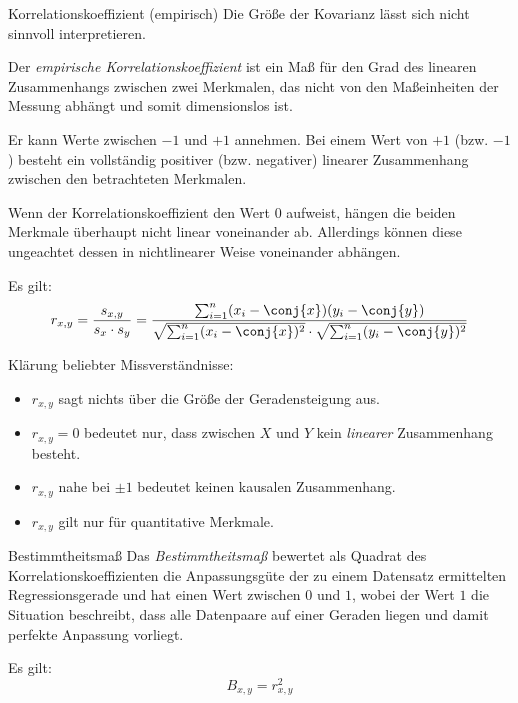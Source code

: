 \begin{defi}{Korrelationskoeffizient (empirisch)}
    Die Größe der Kovarianz lässt sich nicht sinnvoll interpretieren.

    Der \emph{empirische Korrelationskoeffizient} ist ein Maß für den Grad des linearen Zusammenhangs zwischen zwei Merkmalen, das nicht von den Maßeinheiten der Messung abhängt und somit dimensionslos ist.

    Er kann Werte zwischen $-1$ und $+1$ annehmen.
    Bei einem Wert von $+1$ (bzw. $-1$) besteht ein vollständig positiver (bzw. negativer) linearer Zusammenhang zwischen den betrachteten Merkmalen.

    Wenn der Korrelationskoeffizient den Wert $0$ aufweist, hängen die beiden Merkmale überhaupt nicht linear voneinander ab.
    Allerdings können diese ungeachtet dessen in nichtlinearer Weise voneinander abhängen.

    Es gilt:
    \[
        r_{x, y} = \frac{s_{x, y}}{s_x \cdot s_y} = \frac{\sum_{i=1}^{n} (x_i - \conj{x}) (y_i - \conj{y})}{\sqrt{ \sum_{i=1}^{n} (x_i - \conj{x})^2 } \cdot \sqrt{ \sum_{i=1}^{n} (y_i - \conj{y})^2 }}
    \]

    Klärung beliebter Missverständnisse:
    \begin{itemize}
        \item $r_{x, y}$ sagt nichts über die Größe der Geradensteigung aus.
        \item $r_{x, y} = 0$ bedeutet nur, dass zwischen $X$ und $Y$ kein \emph{linearer} Zusammenhang besteht.
        \item $r_{x, y}$ nahe bei $\pm 1$ bedeutet keinen kausalen Zusammenhang.
        \item $r_{x, y}$ gilt nur für quantitative Merkmale.
    \end{itemize}
\end{defi}

\begin{bonus}{Bestimmtheitsmaß}
    Das \emph{Bestimmtheitsmaß} bewertet als Quadrat des Korrelationskoeffizienten die Anpassungsgüte der zu einem Datensatz ermittelten Regressionsgerade und hat einen Wert zwischen $0$ und $1$, wobei der Wert $1$ die Situation beschreibt, dass alle Datenpaare auf einer Geraden liegen und damit perfekte Anpassung vorliegt.

    Es gilt:
    \[
        B_{x, y} = r_{x, y}^2
    \]
\end{bonus}

